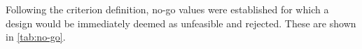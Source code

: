 




Following the criterion definition, no-go values were established for which a design would be immediately deemed as unfeasible and rejected. These are shown in \autoref{tab:no-go}.

